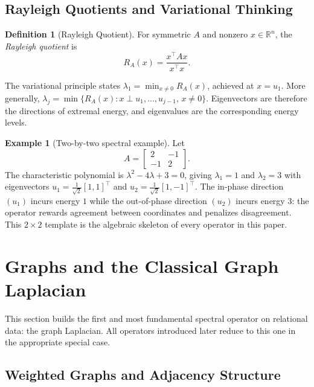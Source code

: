 \documentclass[11pt]{article}
\theoremstyle{definition}
\newtheorem{definition}[theorem]{Definition}
\newtheorem{example}[theorem]{Example}
\theoremstyle{remark}
\newcommand{\R}{\mathbb{R}}
\begin{document}
\subsection{Rayleigh Quotients and Variational Thinking}

\begin{definition}[Rayleigh Quotient]
For symmetric $A$ and nonzero $x \in \R^n$, the \emph{Rayleigh quotient} is
\[
  R_A(x) = \frac{x^\top A x}{x^\top x}.
\]
\end{definition}

The variational principle states $\lambda_1 = \min_{x \neq 0} R_A(x)$, achieved
at $x = u_1$. More generally, $\lambda_j = \min\{R_A(x) : x \perp
u_1,\dots,u_{j-1},\, x\neq 0\}$. Eigenvectors are therefore the directions of
extremal energy, and eigenvalues are the corresponding energy levels.

\begin{example}[Two-by-two spectral example]
\label{ex:2x2}
Let
\[
  A = \begin{bmatrix} 2 & -1 \\ -1 & 2 \end{bmatrix}.
\]
The characteristic polynomial is $\lambda^2 - 4\lambda + 3 = 0$, giving
$\lambda_1 = 1$ and $\lambda_2 = 3$ with eigenvectors
$u_1 = \tfrac{1}{\sqrt{2}}[1,1]^\top$ and
$u_2 = \tfrac{1}{\sqrt{2}}[1,-1]^\top$. The in-phase direction $(u_1)$ incurs
energy $1$ while the out-of-phase direction $(u_2)$ incurs energy $3$: the
operator rewards agreement between coordinates and penalizes disagreement. This
$2\times 2$ template is the algebraic skeleton of every operator in this paper.
\end{example}


\section{Graphs and the Classical Graph Laplacian}
\label{sec:graph}

This section builds the first and most fundamental spectral operator on
relational data: the graph Laplacian. All operators introduced later reduce to
this one in the appropriate special case.

\subsection{Weighted Graphs and Adjacency Structure}
\end{document}
